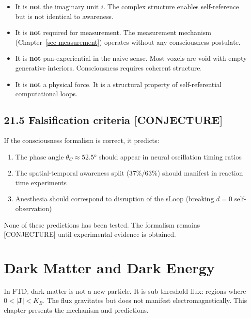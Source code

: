 \documentclass[
  11pt,
  letterpaper,
  twoside,
  openright]{book}
\providecommand{\tightlist}{%
  \setlength{\itemsep}{0pt}\setlength{\parskip}{0pt}}
\begin{document}
\begin{itemize}
\tightlist
\item
  It is \textbf{not} the imaginary unit \(i\). The complex structure
  enables self-reference but is not identical to awareness.
\item
  It is \textbf{not} required for measurement. The measurement mechanism
  (Chapter~\ref{sec-measurement}) operates without any consciousness
  postulate.
\item
  It is \textbf{not} pan-experiential in the naive sense. Most voxels
  are void with empty generative interiors. Consciousness requires
  coherent structure.
\item
  It is \textbf{not} a physical force. It is a structural property of
  self-referential computational loops.
\end{itemize}

\section{21.5 Falsification criteria
{[}CONJECTURE{]}}\label{falsification-criteria-conjecture}

If the consciousness formalism is correct, it predicts:

\begin{enumerate}
\def\labelenumi{\arabic{enumi}.}
\tightlist
\item
  The phase angle \(\theta_C \approx 52.5°\) should appear in neural
  oscillation timing ratios
\item
  The spatial-temporal awareness split (\(37\%/63\%\)) should manifest
  in reaction time experiments
\item
  Anesthesia should correspond to disruption of the sLoop (breaking
  \(d = 0\) self-observation)
\end{enumerate}

None of these predictions has been tested. The formalism remains
{[}CONJECTURE{]} until experimental evidence is obtained.

\chapter{Dark Matter and Dark Energy}\label{sec-dark}

In FTD, dark matter is not a new particle. It is sub-threshold flux:
regions where \(0 < |\mathbf{J}| < K_B\). The flux gravitates but does
not manifest electromagnetically. This chapter presents the mechanism
and predictions.
\end{document}
